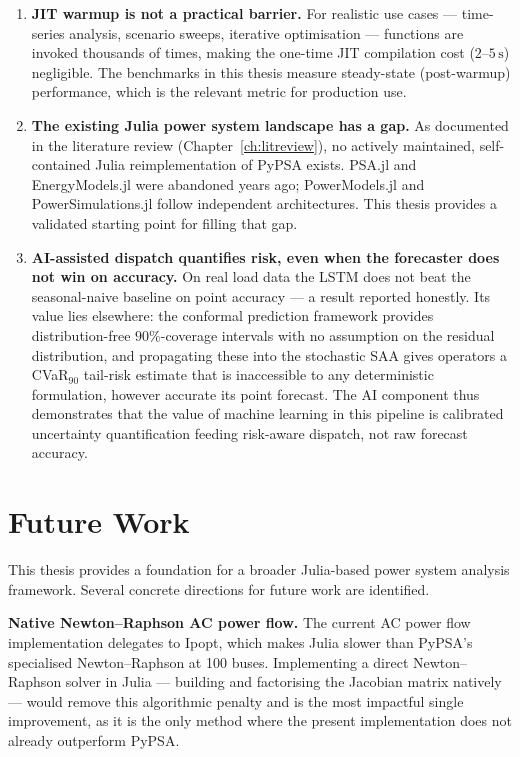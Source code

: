 \begin{enumerate}
    \item \textbf{JIT warmup is not a practical barrier.}
    For realistic use cases --- time-series analysis, scenario sweeps, iterative optimisation --- functions are invoked thousands of times, making the one-time JIT compilation cost ($2$--$5\,\text{s}$) negligible. The benchmarks in this thesis measure steady-state (post-warmup) performance, which is the relevant metric for production use.

    \item \textbf{The existing Julia power system landscape has a gap.}
    As documented in the literature review (Chapter~\ref{ch:litreview}), no actively maintained, self-contained Julia reimplementation of PyPSA exists. PSA.jl and EnergyModels.jl were abandoned years ago; PowerModels.jl and PowerSimulations.jl follow independent architectures. This thesis provides a validated starting point for filling that gap.

    \item \textbf{AI-assisted dispatch quantifies risk, even when the forecaster does not win on accuracy.}
    On real load data the LSTM does not beat the seasonal-naive baseline on point accuracy --- a result reported honestly. Its value lies elsewhere: the conformal prediction framework provides distribution-free $90\%$-coverage intervals with no assumption on the residual distribution, and propagating these into the stochastic SAA gives operators a CVaR$_{90}$ tail-risk estimate that is inaccessible to any deterministic formulation, however accurate its point forecast. The AI component thus demonstrates that the value of machine learning in this pipeline is calibrated uncertainty quantification feeding risk-aware dispatch, not raw forecast accuracy.
\end{enumerate}

\section{Future Work}
\label{sec:future}

This thesis provides a foundation for a broader Julia-based power system analysis framework. Several concrete directions for future work are identified.

\textbf{Native Newton--Raphson AC power flow.}
The current AC power flow implementation delegates to Ipopt, which makes Julia slower than PyPSA's specialised Newton--Raphson at 100 buses. Implementing a direct Newton--Raphson solver in Julia --- building and factorising the Jacobian matrix natively --- would remove this algorithmic penalty and is the most impactful single improvement, as it is the only method where the present implementation does not already outperform PyPSA.

